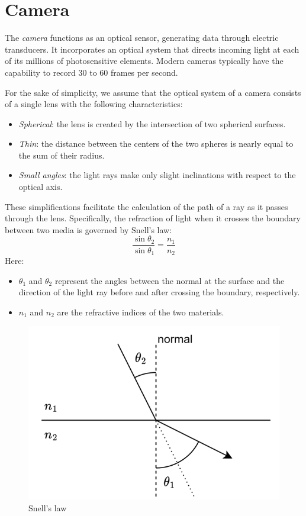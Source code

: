 \section{Camera}

\begin{definition}
The \emph{camera} functions as an optical sensor, generating data through electric transducers. 
It incorporates an optical system that directs incoming light at each of its millions of photosensitive elements. 
Modern cameras typically have the capability to record 30 to 60 frames per second.
\end{definition}
For the sake of simplicity, we assume that the optical system of a camera consists of a single lens with the following characteristics:
\begin{itemize}
    \item \textit{Spherical}: the lens is created by the intersection of two spherical surfaces.
    \item \textit{Thin}: the distance between the centers of the two spheres is nearly equal to the sum of their radius.
    \item \textit{Small angles}: the light rays make only slight inclinations with respect to the optical axis.
\end{itemize}
These simplifications facilitate the calculation of the path of a ray as it passes through the lens.
Specifically, the refraction of light when it crosses the boundary between two media is governed by Snell's law:
\[\dfrac{\sin{\theta_2}}{\sin{\theta_1}}=\dfrac{n_1}{n_2}\]
Here: 
\begin{itemize}
    \item $\theta_1$ and $\theta_2$ represent the angles between the normal at the surface and the direction of the light ray before and after crossing the boundary, respectively.
    \item $n_1$ and $n_2$ are the refractive indices of the two materials.
\end{itemize}
\begin{figure}[H]
    \centering
    \includegraphics[width=0.4\linewidth]{images/refraction.png}
    \caption{Snell's law}
\end{figure}
